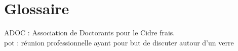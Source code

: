 \chapter*{Glossaire}

ADOC : Association de Doctorants pour le Cidre frais.\\
pot : réunion professionnelle ayant pour but de discuter autour d'un verre 